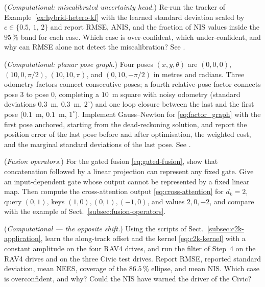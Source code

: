 \begin{prob}\label{prob:ch04:6}
(\emph{Computational: miscalibrated uncertainty head.}) Re-run the tracker of Example~\ref{ex:hybrid-hetero-kf} with the learned standard deviation scaled by $c\in\{0.5,\,1,\,2\}$ and report RMSE, ANIS, and the fraction of NIS values inside the $95\,\%$ band for each case. Which case is over-confident, which under-confident, and why can RMSE alone not detect the miscalibration? See .
\end{prob}
\begin{prob}\label{prob:ch04:7}
(\emph{Computational: planar pose graph.}) Four poses $(x,y,\theta)$ are $(0,0,0)$, $(10,0,\pi/2)$, $(10,10,\pi)$, and $(0,10,-\pi/2)$ in metres and radians. Three odometry factors connect consecutive poses; a fourth relative-pose factor connects pose 3 to pose 0, completing a $10$~m square with noisy odometry (standard deviations $0.3$~m, $0.3$~m, $2^{\circ}$) and one loop closure between the last and the first pose ($0.1$~m, $0.1$~m, $1^{\circ}$). Implement Gauss--Newton for \eqref{eq:factor_graph} with the first pose anchored, starting from the dead-reckoning solution, and report the position error of the last pose before and after optimisation, the weighted cost, and the marginal standard deviations of the last pose. See .
\end{prob}
\begin{prob}\label{prob:ch04:8}
(\emph{Fusion operators.}) For the gated fusion \eqref{eq:gated-fusion}, show that concatenation followed by a linear projection can represent any fixed gate. Give an input-dependent gate whose output cannot be represented by a fixed linear map. Then compute the cross-attention output \eqref{eq:cross-attention} for $d_k=2$, query $(0,1)$, keys $(1,0),(0,1),(-1,0)$, and values $2,0,-2$, and compare with the example of Sect.~\ref{subsec:fusion-operators}.
\end{prob}

\begin{prob}\label{prob:ch04:9}
(\emph{Computational --- the opposite shift.}) Using the scripts of Sect.~\ref{subsec:c2k-application}, learn the along-track offset and the kernel \eqref{eq:c2k-kernel} with a constant amplitude on the four RAV4 drives, and run the filter of Step~4 on the RAV4 drives and on the three Civic test drives. Report RMSE, reported standard deviation, mean NEES, coverage of the $86.5\,\%$ ellipse, and mean NIS. Which case is overconfident, and why? Could the NIS have warned the driver of the Civic?
\end{prob}

